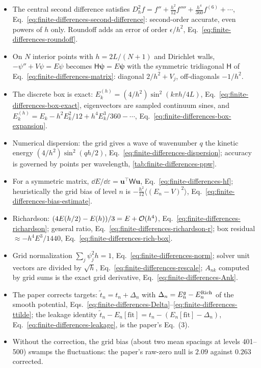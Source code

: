 \begin{itemize}
\item The central second difference satisfies $D_h^2f=f''+\tfrac{h^2}{12}f''''+\tfrac{h^4}{360}f^{(6)}+\cdots$, Eq.~\eqref{eq:finite-differences-second-difference}: second-order accurate, even powers of $h$ only. Roundoff adds an error of order $\epsilon/h^2$, Eq.~\eqref{eq:finite-differences-roundoff}.
\item On $N$ interior points with $h=2L/(N+1)$ and Dirichlet walls, $-\psi''+V\psi=E\psi$ becomes $\mathsf H\bm\psi=E\bm\psi$ with the symmetric tridiagonal $\mathsf H$ of Eq.~\eqref{eq:finite-differences-matrix}: diagonal $2/h^2+V_j$, off-diagonals $-1/h^2$.
\item The discrete box is exact: $E_k^{(h)}=(4/h^2)\sin^2(k\pi h/4L)$, Eq.~\eqref{eq:finite-differences-box-exact}, eigenvectors are sampled continuum sines, and $E_k^{(h)}=E_k-h^2E_k^2/12+h^4E_k^3/360-\cdots$, Eq.~\eqref{eq:finite-differences-box-expansion}.
\item Numerical dispersion: the grid gives a wave of wavenumber $q$ the kinetic energy $(4/h^2)\sin^2(qh/2)$, Eq.~\eqref{eq:finite-differences-dispersion}; accuracy is governed by points per wavelength, \cref{tab:finite-differences-ppw}.
\item For a symmetric matrix, $\dd E/\dd\varepsilon=\mathbf u^\top\mathsf W\mathbf u$, Eq.~\eqref{eq:finite-differences-hf}; heuristically the grid bias of level $n$ is $-\tfrac{h^2}{12}\langle(E_n-V)^2\rangle$, Eq.~\eqref{eq:finite-differences-bias-estimate}.
\item Richardson: $(4E(h/2)-E(h))/3=E+\mathcal{O}(h^4)$, Eq.~\eqref{eq:finite-differences-richardson}; general ratio, Eq.~\eqref{eq:finite-differences-richardson-r}; box residual $\approx-h^4E^3/1440$, Eq.~\eqref{eq:finite-differences-rich-box}.
\item Grid normalization $\sum_j\psi_j^2h=1$, Eq.~\eqref{eq:finite-differences-norm}; solver unit vectors are divided by $\sqrt h$, Eq.~\eqref{eq:finite-differences-rescale}; $A_{nk}$ computed by grid sums is the exact grid derivative, Eq.~\eqref{eq:finite-differences-Ank}.
\item The paper corrects targets: $\tilde t_n=t_n+\Delta_n$ with $\Delta_n=E^g_n-E^{\rm Rich}_n$ of the smooth potential, Eqs.~\eqref{eq:finite-differences-Delta}--\eqref{eq:finite-differences-ttilde}; the leakage identity $\tilde t_n-E_n[\mathrm{fit}]=t_n-(E_n[\mathrm{fit}]-\Delta_n)$, Eq.~\eqref{eq:finite-differences-leakage}, is the paper's Eq.~(3).
\item Without the correction, the grid bias (about two mean spacings at levels 401--500) swamps the fluctuations: the paper's raw-zero null is $2.09$ against $0.263$ corrected.
\end{itemize}

